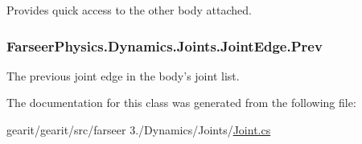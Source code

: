 Provides quick access to the other body attached. 

\hypertarget{class_farseer_physics_1_1_dynamics_1_1_joints_1_1_joint_edge_a35a8d7b32066201b879b0d8d5a61af9b}{
\subsubsection[{Prev}]{ Farseer\+Physics.\+Dynamics.\+Joints.\+Joint\+Edge.\+Prev}}\label{class_farseer_physics_1_1_dynamics_1_1_joints_1_1_joint_edge_a35a8d7b32066201b879b0d8d5a61af9b}


The previous joint edge in the body's joint list. 



The documentation for this class was generated from the following file\+:\begin{DoxyCompactItemize}
\item 
gearit/gearit/src/farseer 3./\+Dynamics/\+Joints/\hyperlink{_joint_8cs}{Joint.\+cs}\end{DoxyCompactItemize}
